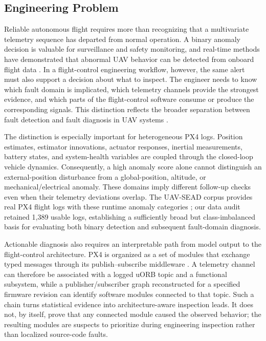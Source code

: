 \subsection{Engineering Problem}

Reliable autonomous flight requires more than recognizing that a multivariate telemetry sequence has departed from normal operation. A binary anomaly decision is valuable for surveillance and safety monitoring, and real-time methods have demonstrated that abnormal UAV behavior can be detected from onboard flight data \cite{keipour2019automatic,wei2026aerotsboost}. In a flight-control engineering workflow, however, the same alert must also support a decision about what to inspect. The engineer needs to know which fault domain is implicated, which telemetry channels provide the strongest evidence, and which parts of the flight-control software consume or produce the corresponding signals. This distinction reflects the broader separation between fault detection and fault diagnosis in UAV systems \cite{fourlas2021survey,puchalski2022uav,tan2026anomaly}.

The distinction is especially important for heterogeneous PX4 logs. Position estimates, estimator innovations, actuator responses, inertial measurements, battery states, and system-health variables are coupled through the closed-loop vehicle dynamics. Consequently, a high anomaly score alone cannot distinguish an external-position disturbance from a global-position, altitude, or mechanical/electrical anomaly. These domains imply different follow-up checks even when their telemetry deviations overlap. The UAV-SEAD corpus provides real PX4 flight logs with these runtime anomaly categories \cite{kabaoglu2026uavsead}; our data audit retained 1,389 usable logs, establishing a sufficiently broad but class-imbalanced basis for evaluating both binary detection and subsequent fault-domain diagnosis.

Actionable diagnosis also requires an interpretable path from model output to the flight-control architecture. PX4 is organized as a set of modules that exchange typed messages through its publish--subscribe middleware \cite{meier2015px4,px4uorbdocs2026}. A telemetry channel can therefore be associated with a logged uORB topic and a functional subsystem, while a publisher/subscriber graph reconstructed for a specified firmware revision can identify software modules connected to that topic. Such a chain turns statistical evidence into architecture-aware inspection leads. It does not, by itself, prove that any connected module caused the observed behavior; the resulting modules are suspects to prioritize during engineering inspection rather than localized source-code faults.

